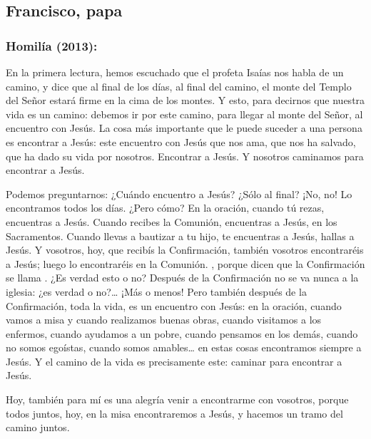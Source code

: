 \newsection
		
		\subsection{Francisco, papa}
		
			\subsubsection{Homilía (2013):}
			
				
				\begin{body}
					En la primera lectura, hemos escuchado que el profeta Isaías nos habla de un camino, y dice que al final de los días, al final del camino, el monte del Templo del Señor estará firme en la cima de los montes. Y esto, para decirnos que nuestra vida es un camino: debemos ir por este camino, para llegar al monte del Señor, al encuentro con Jesús. La cosa más importante que le puede suceder a una persona es encontrar a Jesús: este encuentro con Jesús que nos ama, que nos ha salvado, que ha dado su vida por nosotros. Encontrar a Jesús. Y nosotros caminamos para encontrar a Jesús. 
					
					Podemos preguntarnos: ¿Cuándo encuentro a Jesús? ¿Sólo al final? ¡No, no! Lo encontramos todos los días. ¿Pero cómo? En la oración, cuando tú rezas, encuentras a Jesús. Cuando recibes la Comunión, encuentras a Jesús, en los Sacramentos. Cuando llevas a bautizar a tu hijo, te encuentras a Jesús, hallas a Jesús. Y vosotros, hoy, que recibís la Confirmación, también vosotros encontraréis a Jesús; luego lo encontraréis en la Comunión. , porque dicen que la Confirmación se llama . ¿Es verdad esto o no? Después de la Confirmación no se va nunca a la iglesia: ¿es verdad o no?\ldots{} ¡Más o menos! Pero también después de la Confirmación, toda la vida, es un encuentro con Jesús: en la oración, cuando vamos a misa y cuando realizamos buenas obras, cuando visitamos a los enfermos, cuando ayudamos a un pobre, cuando pensamos en los demás, cuando no somos egoístas, cuando somos amables\ldots{} en estas cosas encontramos siempre a Jesús. Y el camino de la vida es precisamente este: caminar para encontrar a Jesús. 
					
					Hoy, también para mí es una alegría venir a encontrarme con vosotros, porque todos juntos, hoy, en la misa encontraremos a Jesús, y hacemos un tramo del camino juntos. 
					

\end{body}
